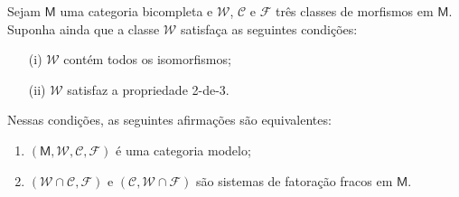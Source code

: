 \begin{prop}
  Sejam $\mathsf{M}$ uma categoria bicompleta e $\mathcal{W}$, $\mathcal{C}$ e $\mathcal{F}$ três classes de morfismos em $\mathsf{M}$.
  Suponha ainda que a classe $\mathcal{W}$ satisfaça as seguintes condições:
  \begin{enumerate}
  \item[(i)] $\mathcal{W}$ contém todos os isomorfismos;
    
  \item[(ii)] $\mathcal{W}$ satisfaz a propriedade 2-de-3.
  \end{enumerate}
  Nessas condições, as seguintes afirmações são equivalentes:
  \begin{enumerate}
  \item $(\mathsf{M},\mathcal{W},\mathcal{C},\mathcal{F})$ é uma categoria modelo;
    
  \item $(\mathcal{W} \cap \mathcal{C},\mathcal{F})$ e $(\mathcal{C},\mathcal{W} \cap \mathcal{F})$ são sistemas de fatoração fracos em $\mathsf{M}$.
  \end{enumerate}
\end{prop}

